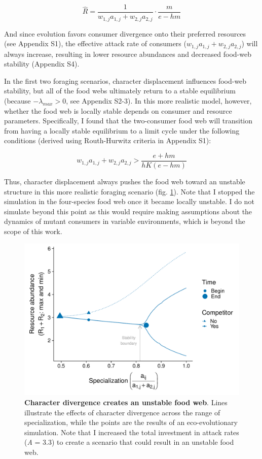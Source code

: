 \documentclass[11pt,]{article}
\begin{document}
\begin{equation} \label{eq:7}
  \hat{R}=\frac{1}{w_{1,j}a_{1,j}+w_{2,j}a_{2,j}}\cdot\frac{m}{e-hm}
\end{equation}

And since evolution favors consumer divergence onto their preferred
resources (see Appendix S1), the effective attack rate of consumers
(\(w_{1,j}a_{1,j}+w_{2,j}a_{2,j}\)) will always increase, resulting in
lower resource abundances and decreased food-web stability (Appendix
S4).

In the first two foraging scenarios, character displacement influences
food-web stability, but all of the food webs ultimately return to a
stable equilibrium (because \(-\lambda_{max}>0\), see Appendix S2-3). In
this more realistic model, however, whether the food web is locally
stable depends on consumer and resource parameters. Specifically, I
found that the two-consumer food web will transition from having a
locally stable equilibrium to a limit cycle under the following
conditions (derived using Routh-Hurwitz criteria in Appendix S1):

\begin{equation} \label{eq:8}
  w_{1,j}a_{1,j}+w_{2,j}a_{2,j} > \frac{e+hm}{hK(e-hm)}
\end{equation}

Thus, character displacement always pushes the food web toward an
unstable structure in this more realistic foraging scenario (fig.
\ref{fig:bifur_plot}). Note that I stopped the simulation in the
four-species food web once it became locally unstable. I do not simulate
beyond this point as this would require making assumptions about the
dynamics of mutant consumers in variable environments, which is beyond
the scope of this work.

\begin{figure}
\centering
\includegraphics{Fig_4_Bifurcation.pdf}
\caption{\label{fig:bifur_plot}\textbf{Character divergence creates an
unstable food web}. Lines illustrate the effects of character divergence
across the range of specialization, while the points are the results of
an eco-evolutionary simulation. Note that I increased the total
investment in attack rates (\emph{A} = 3.3) to create a scenario that
could result in an unstable food web.}
\end{figure}
\end{document}
